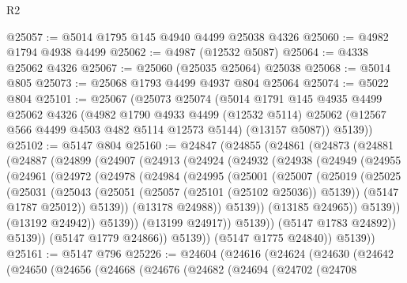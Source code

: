 \begin{lexlean}{R2}
\begin{coremodule}
@25057 := @5014 @1795 @145 @4940 @4499 @25038 @4326
@25060 := @4982 @1794 @4938 @4499
@25062 := @4987 (@12532 @5087)
@25064 := @4338 @25062 @4326
@25067 := @25060 (@25035 @25064) @25038
@25068 := @5014 @805
@25073 := @25068 @1793 @4499 @4937 @804 @25064
@25074 := @5022 @804
@25101 := @25067
    (@25073
      @25074
      (@5014
        @1791
        @145
        @4935
        @4499
        @25062
        @4326
        (@4982
          @1790
          @4933
          @4499
          (@12532 @5114)
          @25062
          (@12567 @566 @4499 @4503 @482 @5114 @12573 @5144)
          (@13157 @5087))
        @5139))
@25102 := @5147 @804
@25160 := @24847
    (@24855
      (@24861
        (@24873
          (@24881
            (@24887
              (@24899
                (@24907
                  (@24913
                    (@24924
                      (@24932
                        (@24938
                          (@24949
                            (@24955
                              (@24961
                                (@24972
                                  (@24978
                                    (@24984
                                      (@24995
                                        (@25001
                                          (@25007
                                            (@25019
                                              (@25025
                                                (@25031
                                                  (@25043
                                                    (@25051 (@25057 (@25101 (@25102 @25036)) @5139))
                                                    (@5147 @1787 @25012))
                                                  @5139))
                                              (@13178 @24988))
                                            @5139))
                                        (@13185 @24965))
                                      @5139))
                                  (@13192 @24942))
                                @5139))
                            (@13199 @24917))
                          @5139))
                      (@5147 @1783 @24892))
                    @5139))
                (@5147 @1779 @24866))
              @5139))
          (@5147 @1775 @24840))
        @5139))
@25161 := @5147 @796
@25226 := @24604
    (@24616
      (@24624
        (@24630
          (@24642
            (@24650
              (@24656
                (@24668
                  (@24676
                    (@24682
                      (@24694
                        (@24702
                          (@24708

\end{coremodule}
\end{lexlean}
